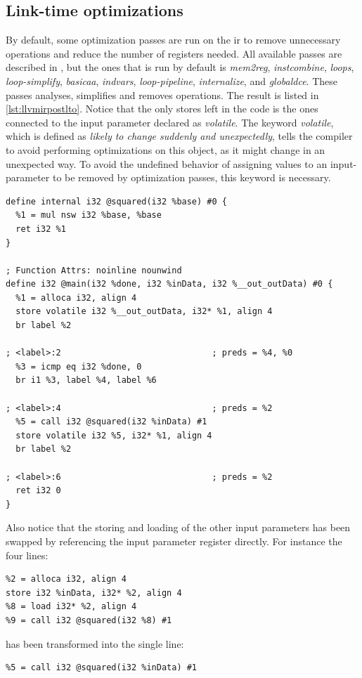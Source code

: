 \subsection{Link-time optimizations}
By default, some optimization passes are run on the \gls{ir} to remove unnecessary operations and reduce the number of registers needed. All available passes are described in \cite{llvmpasses}, but the ones that is run by default is \textit{mem2reg}, \textit{instcombine}, \textit{loops}, \textit{loop-simplify}, \textit{basicaa}, \textit{indvars}, \textit{loop-pipeline}, \textit{internalize}, and \textit{globaldce}. These passes analyses, simplifies and removes operations. The result is listed in \cref{lst:llvmirpostlto}. Notice that the only stores left in the code is the ones connected to the input parameter declared as \textit{volatile}. The keyword \textit{volatile}, which is defined as \textit{likely to change suddenly and unexpectedly}, tells the compiler to avoid performing optimizations on this object, as it might change in an unexpected way. To avoid the undefined behavior of assigning values to an input-parameter to be removed by optimization passes, this keyword is necessary.

\begin{lstlisting}[caption={LLVM IR after LTO},label=lst:llvmirpostlto]
define internal i32 @squared(i32 %base) #0 {
  %1 = mul nsw i32 %base, %base
  ret i32 %1
}

; Function Attrs: noinline nounwind
define i32 @main(i32 %done, i32 %inData, i32 %__out_outData) #0 {
  %1 = alloca i32, align 4
  store volatile i32 %__out_outData, i32* %1, align 4
  br label %2

; <label>:2                              ; preds = %4, %0
  %3 = icmp eq i32 %done, 0
  br i1 %3, label %4, label %6

; <label>:4                              ; preds = %2
  %5 = call i32 @squared(i32 %inData) #1
  store volatile i32 %5, i32* %1, align 4
  br label %2

; <label>:6                              ; preds = %2
  ret i32 0
}
\end{lstlisting}

Also notice that the storing and loading of the other input parameters has been swapped by referencing the input parameter register directly. For instance the four lines:

\begin{lstlisting}
%2 = alloca i32, align 4
store i32 %inData, i32* %2, align 4
%8 = load i32* %2, align 4
%9 = call i32 @squared(i32 %8) #1
\end{lstlisting}
has been transformed into the single line:
\begin{lstlisting}
%5 = call i32 @squared(i32 %inData) #1
\end{lstlisting}

